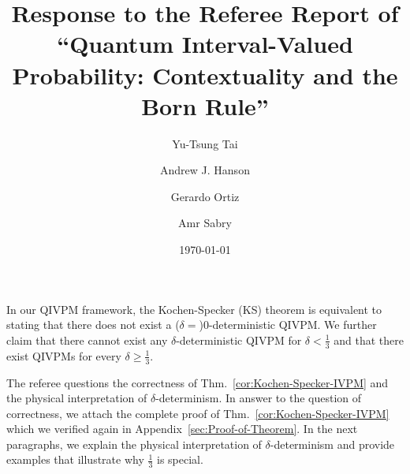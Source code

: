 \documentclass[english,reprint, aps, prl,superscriptaddress, showpacs,
showkeys, longbibliography, amsmath, amssymb, floatfix]{revtex4-1}
\theoremstyle{plain}
\theoremstyle{definition}
\begin{document}
\title{Response to the Referee Report of ``Quantum Interval-Valued Probability:
Contextuality and the Born Rule''}

\author{Yu-Tsung Tai}



\author{Andrew J. Hanson}


\author{Gerardo Ortiz}


\author{Amr Sabry}


\date{\today}

\maketitle

In our QIVPM framework, the Kochen-Specker (KS) theorem is equivalent
to stating that there does not exist a ($\delta=$)$0$-deterministic
QIVPM. We further claim that there cannot exist any $\delta$-deterministic
QIVPM for $\delta<\frac{1}{3}$ and that there exist QIVPMs for every
$\delta\ge\frac{1}{3}$.

The referee questions the correctness of Thm.~\ref{cor:Kochen-Specker-IVPM}
and the physical interpretation of $\delta$-determinism. In answer
to the question of correctness, we attach the complete proof of Thm.~\ref{cor:Kochen-Specker-IVPM}
which we verified again in Appendix~\ref{sec:Proof-of-Theorem}.
In the next paragraphs, we explain the physical interpretation of
$\delta$-determinism and provide examples that illustrate why $\frac{1}{3}$
is special.
\end{document}
